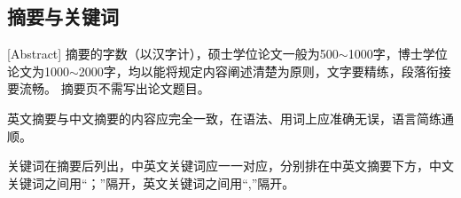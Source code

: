 




\subsection{摘要与关键词}[Abstract]
摘要的字数（以汉字计），硕士学位论文一般为500$\sim$\num{1000}字，博士学位论文为\num{1000}$\sim$\num{2000}字，均以能将规定内容阐述清楚为原则，文字要精练，段落衔接要流畅。
摘要页不需写出论文题目。

英文摘要与中文摘要的内容应完全一致，在语法、用词上应准确无误，语言简练通顺。


关键词在摘要后列出，中英文关键词应一一对应，分别排在中英文摘要下方，中文关键词之间用“；”隔开，英文关键词之间用“,”隔开。













